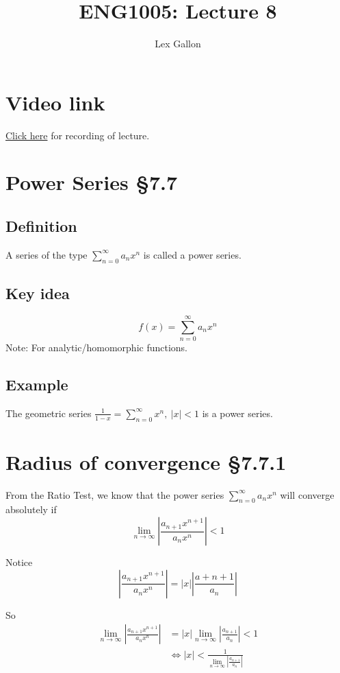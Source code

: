 \documentclass[11pt]{article}
\begin{document}
\title{ENG1005: Lecture 8}
\author{Lex Gallon}
\maketitle

\tableofcontents

\section*{Video link}
\href{https://echo360.org.au/lesson/G_32340f5d-ff38-43d2-be9d-d88ddb1b3611_b944cecf-8ba5-40d3-a870-0243a0a9e78c_2020-04-01T14:58:00.000_2020-04-01T15:53:00.000/classroom#sortDirection=desc}{Click here} for recording of lecture.

\section{Power Series §7.7}
\subsection{Definition}
A series of the type $\displaystyle{\sum_{n=0}^\infty a_n x^n}$ is called a power series.

\subsection{Key idea}
$$f(x)=\sum_{n=0}^\infty a_n x^n$$
Note: For analytic/homomorphic functions.

\subsection{Example}
The geometric series $\displaystyle{\frac{1}{1-x} = \sum_{n=0}^\infty x^n,\ |x|<1}$
is a power series.

\section{Radius of convergence §7.7.1}
From the Ratio Test, we know that the power series $\displaystyle{\sum_{n=0}^\infty a_nx^n}$ will converge absolutely if
\[ \lim_{n\rightarrow\infty} \left| \frac{a_{n+1}x^{n+1}}{a_nx^n} \right| < 1 \]

Notice
\[  \left| \frac{a_{n+1}x^{n+1}}{a_nx^n} \right| = |x| \left| \frac{a+{n+1}}{a_n} \right| \]

So
\begin{align*}
\lim_{n\rightarrow\infty} \left| \frac{a_{n+1}x^{n+1}}{a_nx^n} \right| &=  |x| \lim_{n\rightarrow\infty} \left| \frac{a_{n+1}}{a_n} \right| < 1 \\
& \Leftrightarrow |x| < \frac{1}{\lim_{n\rightarrow\infty} \left| \frac{a_{n+1}}{a_n} \right|} 
\end{align*}
\end{document}
